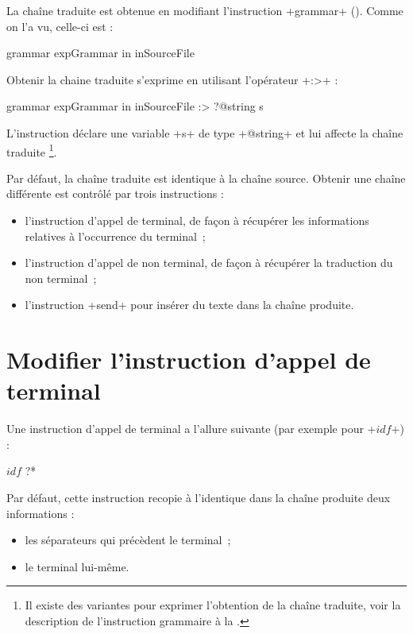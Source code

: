 
La chaîne traduite est obtenue en modifiant l'instruction \ggs+grammar+ (). Comme on l'a vu, celle-ci est : 
\begin{galgas}
grammar expGrammar in inSourceFile
\end{galgas}

Obtenir la chaine traduite s'exprime en utilisant l'opérateur  \ggs+:>+ :
\begin{galgas}
grammar expGrammar in inSourceFile :> ?@string s
\end{galgas}

L'instruction déclare une variable \ggs+s+ de type \ggs+@string+ et lui affecte la chaîne traduite \footnote{Il existe des variantes pour exprimer l'obtention de la chaîne traduite, voir la description de l'instruction grammaire à la .}.

Par défaut, la chaîne traduite est identique à la chaîne source. Obtenir une chaîne différente est contrôlé par trois instructions :
\begin{itemize}
  \item l'instruction d'appel de terminal, de façon à récupérer les informations relatives à l'occurrence du terminal~;
  \item l'instruction d'appel de non terminal, de façon à récupérer la traduction du non terminal~;
  \item l'instruction \ggs+send+ pour insérer du texte dans la chaîne produite.
\end{itemize}







\section{Modifier l'instruction d'appel de terminal}

Une instruction d'appel de terminal a l'allure suivante (par exemple pour \ggs+$idf$+) :
\begin{galgas}
$idf$ ?*
\end{galgas}

Par défaut, cette instruction recopie à l'identique dans la chaîne produite deux informations :
\begin{itemize}
  \item les séparateurs qui précèdent le terminal~;
  \item le terminal lui-même.
\end{itemize}

